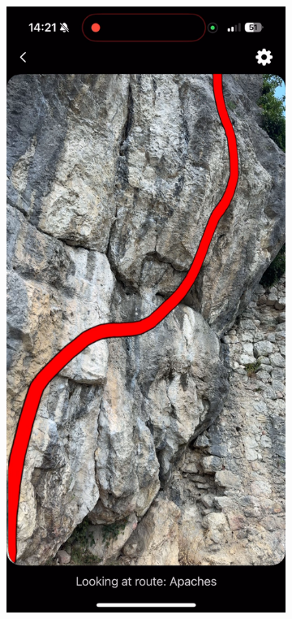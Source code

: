 \begin{figure}[H]
    \centering
    \begin{subfigure}[b]{0.45\textwidth}
        \centering
        \includegraphics[width=\textwidth]{images/testiranje/apaches_test_left_side.png}

\end{subfigure}
\end{figure}
